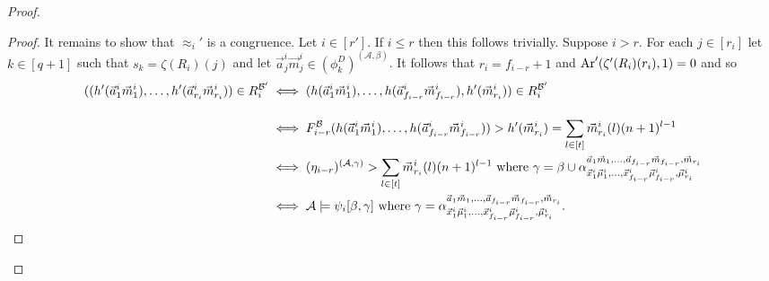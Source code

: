 \documentclass[../main/thesis.tex]{subfiles}
\begin{document}
\begin{proof}
\begin{proof}
    It remains to show that $\approx_i'$ is a congruence. Let $i \in [r']$. If
    $i \leq r$ then this follows trivially. Suppose $i > r$. For each $j \in
    [r_i]$ let $k \in [q + 1]$ such that $s_{k} = \zeta(R_i)(j)$ and let
    $\vec{a}^i_j\vec{m}^i_j \in (\phi^D_{k})^{(\mathcal{A}, \beta)}$. It follows
    that $r_i = f_{i - r} + 1$ and $\text{\upshape Ar}'(\zeta'(R_i)(r_i), 1) = 0$ and so
    \begin{align*}\setlength{\jot}{3ex}
      ((h'(\vec{a}^i_1 \vec{m}^i_1) , \ldots , h'(\vec{a}^i_{r_i}\vec{m}^i_{r_i})) \in
      R^{\mathcal{B}'}_i & \iff (h(\vec{a}^i_1 \vec{m}^i_1) , \ldots , h(\vec{a}^i_{f_{i - r}}\vec{m}^i_{f_{i - r}}), h'(\vec{m}^i_{r_i})) \in
                           R^{\mathcal{B}'}_i \\[11pt]
                         & \iff F^{\mathcal{B}}_{i - r}(h(\vec{a}^i_1 \vec{m}^i_1) , \ldots,
                           h(\vec{a}^i_{f_{i - r}}\vec{m}^i_{f_{i - r}})) >  h'(\vec{m}^i_{r_i}) = \sum_{l \in [t]} \vec{m}^i_{r_{i}}(l)(n+1)^{l-1} \\
                         & \iff  (\eta_{i - r})^{(\mathcal{A}, \gamma)} > \sum_{l \in [t]}
                           \vec{m}^i_{r_{i}}(l)(n+1)^{l-1} \text{ where } \gamma = \beta \cup \alpha^{\vec{a}_1\vec{m}_1, \ldots,
                           \vec{a}_{f_{i - r}} \vec{m}_{f_{i -r}}, \vec{m}_{r_i}}_{\vec{x}^i_1 \vec{\mu}^i_1 , \ldots,
                           \vec{x}^i_{f_{i - r}} \vec{\mu}^i_{f_{i - r}}, \vec{\mu}^i_{r_i}} \\
                         & \iff \mathcal{A} \models \psi_i [\beta, \gamma] \text{ where } \gamma = \alpha^{\vec{a}_1\vec{m}_1, \ldots,
                           \vec{a}_{f_{i - r}} \vec{m}_{f_{i -r}}, \vec{m}_{r_i}}_{\vec{x}^i_1 \vec{\mu}^i_1 , \ldots,
                           \vec{x}^i_{f_{i - r}} \vec{\mu}^i_{f_{i - r}}, \vec{\mu}^i_{r_i}}.
    \end{align*}


\end{proof}
\end{proof}
\end{document}
